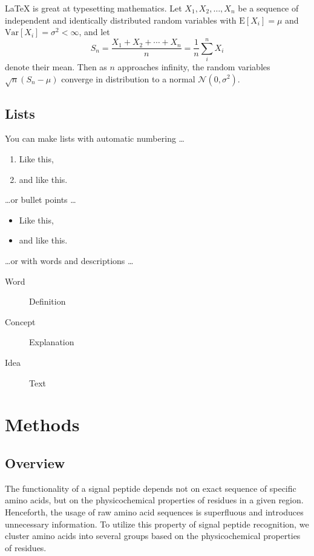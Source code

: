 \documentclass[fleqn,10pt,twoside]{gcb15submission}
\begin{document}
\LaTeX{} is great at typesetting mathematics. Let $X_1, X_2, \ldots, X_n$ be a sequence of independent and identically distributed random variables with $\text{E}[X_i] = \mu$ and $\text{Var}[X_i] = \sigma^2 < \infty$, and let
$$S_n = \frac{X_1 + X_2 + \cdots + X_n}{n}
      = \frac{1}{n}\sum_{i}^{n} X_i$$
denote their mean. Then as $n$ approaches infinity, the random variables $\sqrt{n}(S_n - \mu)$ converge in distribution to a normal $\mathcal{N}(0, \sigma^2)$.

\subsection*{Lists}

You can make lists with automatic numbering \dots

\begin{enumerate}[noitemsep] 
\item Like this,
\item and like this.
\end{enumerate}
\dots or bullet points \dots
\begin{itemize}[noitemsep] 
\item Like this,
\item and like this.
\end{itemize}
\dots or with words and descriptions \dots
\begin{description}
\item[Word] Definition
\item[Concept] Explanation
\item[Idea] Text
\end{description}



\section*{Methods}

\subsection*{Overview}

The functionality of a signal peptide depends not on exact sequence of specific amino acids, but on the physicochemical properties of residues in a given region. Henceforth, the usage of raw amino acid sequences is superfluous and introduces unnecessary information. To utilize this property of signal peptide recognition, we cluster amino acids into several groups based on the physicochemical properties of residues.
\end{document}
